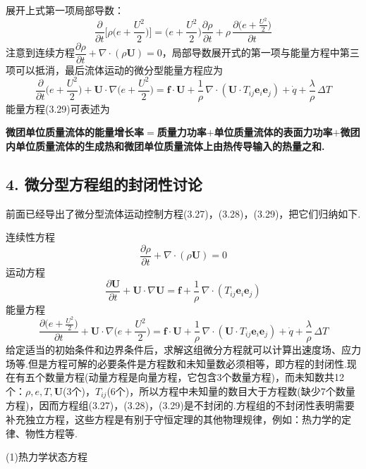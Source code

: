 展开上式第一项局部导数：
\[
\frac{\partial}{\partial t}\bigg[\rho\Big(e+\frac{U^{2}}{2}\Big)\bigg]=\Big(e+\frac{U^{2}}{2}\Big)\frac{\partial\rho}{\partial t}+\rho\,\frac{\partial\big(e+\frac{U^{2}}{2}\big)}{\partial t}
\]
注意到连续方程$\dfrac{\partial\rho}{\partial t}+\nabla\cdot(\rho\boldsymbol{U})=0$，局部导数展开式的第一项与能量方程中第三项可以抵消，最后流体运动的微分型能量方程应为
\begin{equation*}
\frac{\partial}{\partial t}\Big(e+\frac{U^{2}}{2}\Big)+\boldsymbol{U}\cdot\nabla\Big(e+\frac{U^{2}}{2}\Big)=\boldsymbol{f}\cdot\boldsymbol{U}+\frac{1}{\rho}\,\nabla\cdot(\boldsymbol{U}\cdot T_{ij}\boldsymbol{e}_i\boldsymbol{e}_j)+\dot{q}+\frac{\lambda}{\rho}\,\Delta T
\tag{3.29}
\end{equation*}
能量方程(3.29)可表述为

\textbf{微团单位质量流体的能量增长率$=$质量力功率$+$单位质量流体的表面力功率$+$微团内单位质量流体的生成热和微团单位质量流体上由热传导输入的热量之和.}

\subsection*{4. 微分型方程组的封闭性讨论}

前面已经导出了微分型流体运动控制方程(3.27)，(3.28)，(3.29)，把它们归纳如下.

连续性方程
\[
\frac{\partial\rho}{\partial t}+\nabla\cdot(\rho\boldsymbol{U})=0
\]
运动方程
\[
\frac{\partial\boldsymbol{U}}{\partial t}+\boldsymbol{U}\cdot\nabla\boldsymbol{U}=\boldsymbol{f}+\frac{1}{\rho}\,\nabla\cdot(T_{ij}\boldsymbol{e}_i\boldsymbol{e}_j)
\]
能量方程
\[
\frac{\partial\big(e+\frac{U^{2}}{2}\big)}{\partial t}+\boldsymbol{U}\cdot\nabla\Big(e+\frac{U^{2}}{2}\Big)=\boldsymbol{f}\cdot\boldsymbol{U}+\frac{1}{\rho}\,\nabla\cdot(\boldsymbol{U}\cdot T_{ij}\boldsymbol{e}_i\boldsymbol{e}_j)+\dot{q}+\frac{\lambda}{\rho}\,\Delta T
\]
给定适当的初始条件和边界条件后，求解这组微分方程就可以计算出速度场、应力场等.但是方程可解的必要条件是方程数和未知量数必须相等，即方程的封闭性.现在有五个数量方程(动量方程是向量方程，它包含3个数量方程)，而未知数共12个：$\rho,e,T,\boldsymbol{U}$(3个)，$T_{ij}$(6个)，所以方程中未知量的数目大于方程数(缺少7个数量方程)，因而方程组(3.27)，(3.28)，(3.29)是不封闭的.方程组的不封闭性表明需要补充独立方程，这些方程是有别于守恒定理的其他物理规律，例如：热力学的定律、物性方程等.

(1)热力学状态方程

